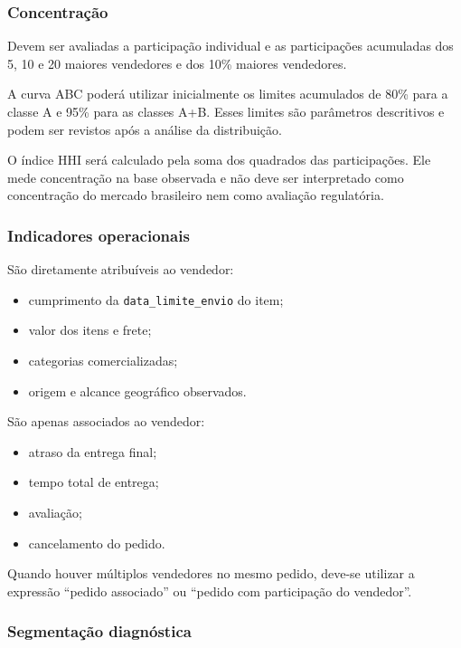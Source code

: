 \documentclass[12pt,a4paper]{article}
\providecommand{\tightlist}{
  \setlength{\itemsep}{0pt}\setlength{\parskip}{0pt}
}
\begin{document}
\subsubsection{Concentração}\label{docs__analytics__contrato_analitico.md__concentrauxe7uxe3o}

Devem ser avaliadas a participação individual e as participações
acumuladas dos 5, 10 e 20 maiores vendedores e dos 10\% maiores
vendedores.

A curva ABC poderá utilizar inicialmente os limites acumulados de 80\%
para a classe A e 95\% para as classes A+B. Esses limites são parâmetros
descritivos e podem ser revistos após a análise da distribuição.

O índice HHI será calculado pela soma dos quadrados das participações.
Ele mede concentração na base observada e não deve ser interpretado como
concentração do mercado brasileiro nem como avaliação regulatória.

\subsubsection{Indicadores
operacionais}\label{docs__analytics__contrato_analitico.md__indicadores-operacionais}

São diretamente atribuíveis ao vendedor:

\begin{itemize}
\tightlist
\item
  cumprimento da \nolinkurl{data_limite_envio} do item;
\item
  valor dos itens e frete;
\item
  categorias comercializadas;
\item
  origem e alcance geográfico observados.
\end{itemize}

São apenas associados ao vendedor:

\begin{itemize}
\tightlist
\item
  atraso da entrega final;
\item
  tempo total de entrega;
\item
  avaliação;
\item
  cancelamento do pedido.
\end{itemize}

Quando houver múltiplos vendedores no mesmo pedido, deve-se utilizar a
expressão ``pedido associado'' ou ``pedido com participação do
vendedor''.

\subsubsection{Segmentação
diagnóstica}\label{docs__analytics__contrato_analitico.md__segmentauxe7uxe3o-diagnuxf3stica}
\end{document}
